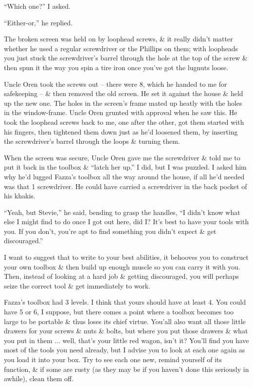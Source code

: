 \documentclass{article}
\numberwithin{equation}{section}
\begin{document}
``Which one?'' I asked.

``Either-or,'' he replied.

The broken screen was held on by loophead screws, \& it really didn't matter whether he used a regular screwdriver or the Phillips on them; with loopheads you just stuck the screwdriver's barrel through the hole at the top of the screw \& then spun it the way you spin a tire iron once you've got the lugnuts loose.

Uncle Oren took the screws out -- there were 8, which he handed to me for safekeeping -- \& then removed the old screen. He set it against the house \& held up the new one. The holes in the screen's frame mated up heatly with the holes in the window-frame. Uncle Oren grunted with approval when he saw this. He took the loophead screws back to me, one after the other, got them started with his fingers, then tightened them down just as he'd loosened them, by inserting the screwdriver's barrel through the loops \& turning them.

When the screen was secure, Uncle Oren gave me the screwdriver \& told me to put it back in the toolbox \& ``latch her up.'' I did, but I was puzzled. I asked him why he'd lugged Fazza's toolbox all the way around the house, if all he'd needed was that 1 screwdriver. He could have carried a screwdriver in the back pocket of his khakis.

``Yeah, but Stevie,'' he said, bending to grasp the handles, ``I didn't know what else I might find to do once I got out here, did I? It's best to have your tools with you. If you don't, you're apt to find something you didn't expect \& get discouraged.''

I want to suggest that to write to your best abilities, it behooves you to construct your own toolbox \& then build up enough muscle so you can carry it with you. Then, instead of looking at a hard job \& getting discouraged, you will perhaps seize the correct tool \& get immediately to work.

Fazza's toolbox had 3 levels. I think that yours should have at least 4. You could have 5 or 6, I suppose, but there comes a point where a toolbox becomes too large to be portable \& thus loses its chief virtue. You'all also want all those little drawers for your screws \& nuts \& bolts, but where you put those drawers \& what you put in them $\ldots$ well, that's your little red wagon, isn't it? You'll find you have most of the tools you need already, but I advise you to look at each one again as you load it into your box. Try to see each one new, remind yourself of its function, \& if some are rusty (as they may be if you haven't done this seriously in awhile), clean them off.
\end{document}
